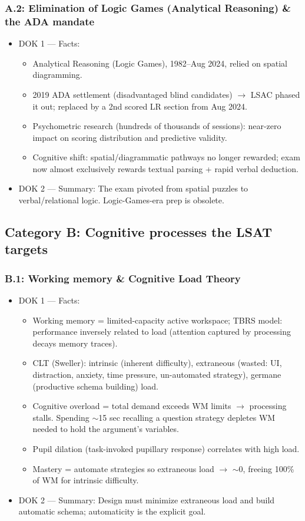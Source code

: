 \documentclass[11pt]{article}
\begin{document}
\subsubsection*{A.2: Elimination of Logic Games (Analytical Reasoning) \& the ADA mandate}
\begin{itemize}
\item DOK 1 --- Facts:
\begin{itemize}
\item Analytical Reasoning (Logic Games), 1982--Aug 2024, relied on spatial diagramming.
\item 2019 ADA settlement (disadvantaged blind candidates) $\rightarrow$ LSAC phased it out; replaced by a 2nd scored LR section from Aug 2024.
\item Psychometric research (hundreds of thousands of sessions): near-zero impact on scoring distribution and predictive validity.
\item Cognitive shift: spatial/diagrammatic pathways no longer rewarded; exam now almost exclusively rewards textual parsing + rapid verbal deduction.
\end{itemize}
\item DOK 2 --- Summary: The exam pivoted from spatial puzzles to verbal/relational logic. Logic-Games-era prep is obsolete.
\end{itemize}

\subsection*{Category B: Cognitive processes the LSAT targets}
\subsubsection*{B.1: Working memory \& Cognitive Load Theory}
\begin{itemize}
\item DOK 1 --- Facts:
\begin{itemize}
\item Working memory = limited-capacity active workspace; TBRS model: performance inversely related to load (attention captured by processing decays memory traces).
\item CLT (Sweller): intrinsic (inherent difficulty), extraneous (wasted: UI, distraction, anxiety, time pressure, un-automated strategy), germane (productive schema building) load.
\item Cognitive overload = total demand exceeds WM limits $\rightarrow$ processing stalls. Spending $\sim$15 sec recalling a question strategy depletes WM needed to hold the argument's variables.
\item Pupil dilation (task-invoked pupillary response) correlates with high load.
\item Mastery = automate strategies so extraneous load $\rightarrow$ $\sim$0, freeing 100\% of WM for intrinsic difficulty.
\end{itemize}
\item DOK 2 --- Summary: Design must minimize extraneous load and build automatic schema; automaticity is the explicit goal.
\end{itemize}
\end{document}
